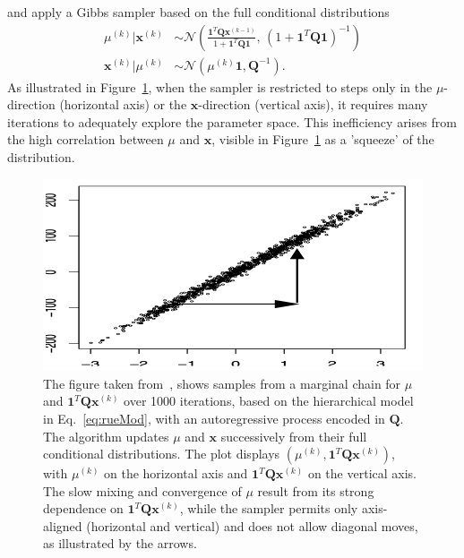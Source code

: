 and apply a Gibbs sampler based on the full conditional distributions
\begin{align}
	\mu^{(k)} | \bm{x}^{(k)} &\sim \mathcal{N} \left( \frac{\bm{1}^T \bm{Q} \bm{x}^{(k-1)}}{1 + \bm{1}^T \bm{Q} \bm{1}}, \, \left(1 + \bm{1}^T \bm{Q} \bm{1} \right)^{-1} \right) \\
	\bm{x}^{(k)} | \mu^{(k)} &\sim \mathcal{N}(\mu^{(k)} \bm{1}, \bm{Q}^{-1}).
\end{align}
As illustrated in Figure~\ref{fig:RueHeld}, when the sampler is restricted to steps only in the $\mu$-direction (horizontal axis) or the $\bm{x}$-direction (vertical axis), it requires many iterations to adequately explore the parameter space. 
This inefficiency arises from the high correlation between $\mu$ and $\bm{x}$, visible in Figure~\ref{fig:RueHeld} as a 'squeeze' of the distribution.
\begin{figure}[ht!]
	\centering
	\includegraphics[width = \textwidth]{Figures/RueHeldBookFig.png}
	\caption[Correlation structure in between parameters and hyper-parameters]{The figure taken from~\cite[Figure 4.1 (b)]{rue2005gaussian}, shows samples from a marginal chain for $\mu$ and $\bm{1}^T \bm{Q} \bm{x}^{(k)}$ over 1000 iterations, based on the hierarchical model in Eq.~\ref{eq:rueMod}, with an autoregressive process encoded in $\bm{Q}$. The algorithm updates $\mu$ and $\bm{x}$ successively from their full conditional distributions. The plot displays $(\mu^{(k)}, \bm{1}^T \bm{Q} \bm{x}^{(k)})$, with $\mu^{(k)}$ on the horizontal axis and $\bm{1}^T \bm{Q} \bm{x}^{(k)}$ on the vertical axis. The slow mixing and convergence of $\mu$ result from its strong dependence on $\bm{1}^T \bm{Q} \bm{x}^{(k)}$, while the sampler permits only axis-aligned (horizontal and vertical) and does not allow diagonal moves, as illustrated by the arrows.}
	\label{fig:RueHeld}
\end{figure}

